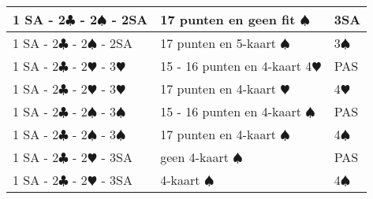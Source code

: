 \documentclass[12pt,a4paper]{report}
\begin{document}
\begin{tabular}{|l|p{4cm}|l|}
	1 SA	- 2$\clubsuit$ - 2$\spadesuit$ - 2SA  
	& 17 punten\newline 
	en geen fit $\spadesuit$ 
	& 3SA \\
	\hline  
	
	1 SA	- 2$\clubsuit$ - 2$\spadesuit$ - 2SA	 
	& 17 punten\newline 
	en 5-kaart $\spadesuit$
	& 3$\spadesuit$ \\
	\hline \hline
	
	1 SA	- 2$\clubsuit$ - 2$\varheartsuit$ - 3$\varheartsuit$	
	& 15 - 16 punten\newline 
	en 4-kaart 4$\varheartsuit$
	& PAS \\
	\hline 
	
	1 SA	- 2$\clubsuit$ - 2$\varheartsuit$ - 3$\varheartsuit$	 
	& 17 punten\newline 
	en 4-kaart $\varheartsuit$ 
	& 4$\varheartsuit$ \\
	\hline \hline
	
	1 SA	- 2$\clubsuit$ - 2$\spadesuit$ - 3$\spadesuit$	
	& 15 - 16 punten\newline 
	en 4-kaart $\spadesuit$ 
	& PAS \\
	\hline 
	
	1 SA	- 2$\clubsuit$ - 2$\spadesuit$ - 3$\spadesuit$	 
	& 17 punten\newline 
	en 4-kaart $\spadesuit$ 
	& 4$\spadesuit$ \\
	\hline \hline
	
	1 SA - 2$\clubsuit$ - 2$\varheartsuit$ - 3SA	 
	& geen 4-kaart $\spadesuit$ 
	& PAS \\
	\hline 
	
	1 SA	- 2$\clubsuit$ - 2$\varheartsuit$ - 3SA	 
	& 4-kaart $\spadesuit$
	& 4$\spadesuit$\\
	\hline 	
\end{tabular}
\end{document}

